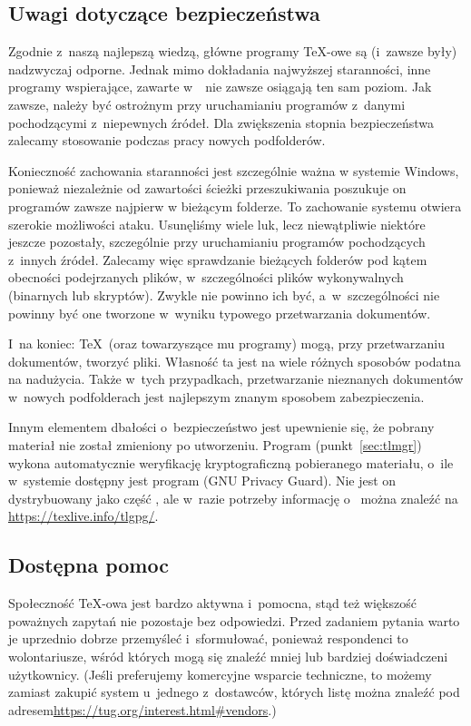 \documentclass{article}
\begin{document}
\subsection{Uwagi dotyczące bezpieczeństwa}
\label{sec:security}

Zgodnie z~naszą najlepszą wiedzą, główne programy \TeX-owe są
(i~zawsze były) nadzwyczaj odporne. Jednak mimo dokładania najwyższej
staranności, inne programy wspierające, zawarte w~\TL\  nie
zawsze osiągają ten sam poziom. Jak zawsze, należy być
ostrożnym przy uruchamianiu programów z~danymi pochodzącymi
z~niepewnych źródeł. Dla zwiększenia stopnia
bezpieczeństwa zalecamy stosowanie podczas pracy nowych podfolderów.

Konieczność zachowania staranności jest szczególnie ważna w systemie
Windows, ponieważ niezależnie od zawartości ścieżki przeszukiwania
poszukuje on programów zawsze najpierw w bieżącym folderze. To
zachowanie systemu otwiera szerokie możliwości ataku. Usunęliśmy
wiele luk, lecz niewątpliwie niektóre jeszcze pozostały, szczególnie
przy uruchamianiu programów pochodzących z~innych źródeł.  Zalecamy
więc sprawdzanie bieżących folderów pod kątem obecności podejrzanych
plików, w~szczególności plików wykonywalnych (binarnych lub
skryptów). Zwykle nie powinno ich być, a~w~szczególności nie
powinny być one tworzone w~wyniku typowego przetwarzania dokumentów.

I~na koniec: \TeX\ (oraz towarzyszące mu programy) mogą, przy przetwarzaniu
dokumentów, tworzyć pliki. Własność ta jest na wiele różnych sposobów podatna
na nadużycia. Także w~tych przypadkach, przetwarzanie nieznanych dokumentów
w~nowych podfolderach jest najlepszym znanym sposobem zabezpieczenia.

Innym elementem dbałości o~bezpieczeństwo jest upewnienie się, że pobrany materiał
nie został zmieniony po utworzeniu. Program  (punkt~\ref{sec:tlmgr})
wykona automatycznie weryfikację kryptograficzną pobieranego materiału, o~ile
w~systemie dostępny jest program  (GNU Privacy Guard). Nie jest
on dystrybuowany jako część \TL, ale w~razie potrzeby informację o~ można znaleźć na
\url{https://texlive.info/tlgpg/}.

\subsection{Dostępna pomoc}
\label{sec:help}

Społeczność \TeX-owa jest bardzo aktywna i~pomocna, stąd też większość
poważnych zapytań nie pozostaje bez odpowiedzi. Przed zadaniem
pytania warto je uprzednio dobrze przemyśleć i~sformułować, ponieważ
respondenci to wolontariusze, wśród których mogą się znaleźć mniej lub
bardziej doświadczeni użytkownicy.
(Jeśli preferujemy komercyjne wsparcie techniczne, to możemy zamiast
\TL{} zakupić system u~jednego z~dostawców, których listę można znaleźć
pod adresem\newline \url{https://tug.org/interest.html#vendors}.)
\end{document}
